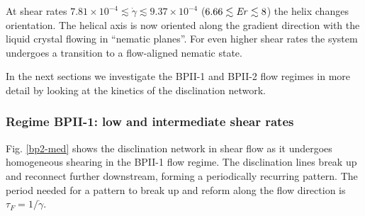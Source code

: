 \documentclass[aps,pre,reprint,superscriptaddress, twocolumn]{revtex4}
\newcommand{\e}[1]{\times10^{#1}}
\newcommand{\gd}{\dot{\gamma}}
\begin{document}
At shear rates $7.81\e{-4}\lesssim\gd \lesssim 9.37\e{-4}$ ($6.66\lesssim {\it Er} \lesssim 8$) the helix changes orientation.
The helical axis is now oriented along the gradient direction with
the liquid crystal flowing in ``nematic planes''. For even higher shear rates
the system undergoes a transition to a flow-aligned nematic state.

In the next sections we investigate the BPII-1 and BPII-2 flow regimes in more detail 
by looking at the kinetics of the disclination network.

\subsubsection{Regime BPII-1: low and intermediate shear rates}

Fig. \ref{bp2-med} shows the disclination network in shear flow as
it undergoes homogeneous shearing in the BPII-1 flow regime. 
The disclination lines break up and 
reconnect further downstream, forming a periodically recurring pattern. The
period needed for a pattern to break up and 
reform along the flow direction is $\tau_F = 1/\gd$.
\end{document}
